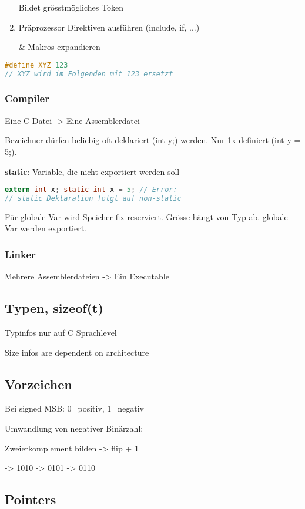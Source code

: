 \begin{multicols*}{4}
\begin{enumerate}
    Bildet grösstmögliches Token
    \item Präprozessor Direktiven ausführen (include, if, ...)

    \& Makros expandieren
\end{enumerate}
\begin{lstlisting}[language=c]
#define XYZ 123
// XYZ wird im Folgenden mit 123 ersetzt
\end{lstlisting}

\subsubsection{Compiler}
Eine C-Datei -> Eine Assemblerdatei

Bezeichner dürfen beliebig oft \underline{deklariert} (int y;) werden. Nur 1x \underline{definiert} (int y = 5;).

\textbf{static}: Variable, die nicht exportiert werden soll

\begin{lstlisting}[language=c]
extern int x; static int x = 5; // Error:
// static Deklaration folgt auf non-static
\end{lstlisting}

Für globale Var wird Speicher fix reserviert. Grösse hängt von Typ ab. globale Var werden exportiert.

\subsubsection{Linker}
Mehrere Assemblerdateien -> Ein Executable

\subsection{Typen, sizeof(t)}
Typinfos nur auf C Sprachlevel

Size infos are dependent on architecture

\subsection{Vorzeichen}
Bei signed MSB: 0=positiv, 1=negativ

Umwandlung von negativer Binärzahl:

Zweierkomplement bilden -> flip + 1

-> 1010 -> 0101 -> 0110

\subsection{Pointers}


\end{multicols*}
